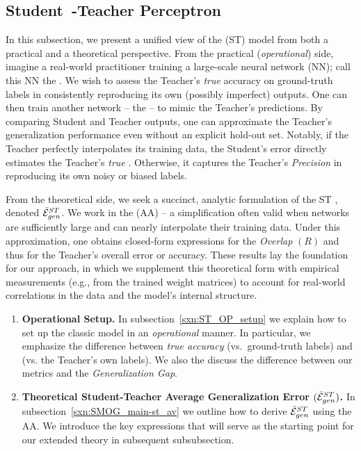 \subsection{Student~-Teacher Perceptron}
\label{sxn:SMOG_main-student_teacher}

In this subsection, we present a unified view of the \emph{\StudentTeacher} (ST) \Perceptron 
model from both a practical and a theoretical perspective.  
From the practical (\emph{operational}) side, imagine a real-world practitioner training a large-scale neural network (NN); call this NN the \Teacher.  
We wish to assess the Teacher’s \emph{true} accuracy on ground-truth labels in consistently reproducing its own (possibly imperfect) outputs. One can then train another network -- the \Student -- to mimic the Teacher’s predictions.  
By comparing Student and Teacher outputs, one can approximate the Teacher’s generalization performance even without an explicit hold-out set.  
Notably, if the Teacher perfectly interpolates its training data, the Student’s error directly estimates the Teacher’s \emph{true} \GeneralizationAccuracy.
Otherwise, it captures the Teacher’s \emph{Precision} in reproducing its own noisy or biased labels.

From the theoretical side, we seek a succinct, analytic formulation of the ST \AverageGeneralizationError, denoted $\bar{\mathcal{E}}^{ST}_{gen}$.  
We work in the \AnnealedApproximation (AA) -- a simplification often valid when networks are sufficiently large and can nearly interpolate their training data. 
Under this approximation, one obtains closed-form expressions for the \StudentTeacher \emph{Overlap} $(R)$
and thus for the Teacher’s overall error or accuracy.  
These results lay the foundation for our \emph{\SemiEmpirical} approach, in which we supplement this theoretical form with empirical measurements (e.g., from the trained weight matrices) to account for real-world correlations in the data and the model’s internal structure.  

\begin{enumerate}[label=4.3.\arabic*]
\item
  \textbf{Operational Setup.}
  In subsection~\ref{sxn:ST_OP_setup} we explain how to set up the classic \StudentTeacher
  model in an \emph{operational} manner. 
  In particular, we emphasize the difference between \emph{true accuracy} (vs.\ ground-truth labels)
  and \Precision (vs. the Teacher’s own labels). We also the discuss the difference between
  our \Quality metrics and the \emph{Generalization Gap}.

  \item
    \textbf{Theoretical Student-Teacher Average Generalization Error $(\bar{\mathcal{E}}^{ST}_{gen})$.}
    In subsection~\ref{sxn:SMOG_main-st_av}  we outline how to derive $\bar{\mathcal{E}}^{ST}_{gen}$ using the AA.  
    We introduce the key expressions that will serve as the starting point for our extended \SemiEmpirical theory in subsequent subsubsection.
\end{enumerate}



\clearpage
